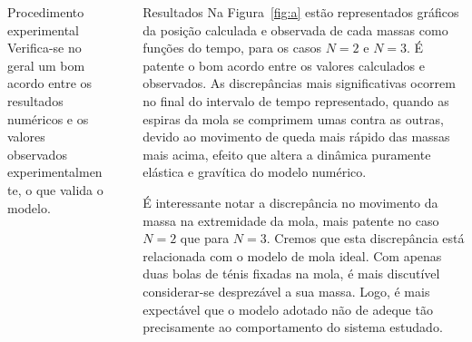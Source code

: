 \documentclass[final]{beamer}
\newlength{\sepwidth}
\newlength{\colwidth}
\newcommand{\separatorcolumn}{\begin{column}{\sepwidth}\end{column}}
\begin{document}
\begin{frame}[t]
\begin{columns}[t]
\begin{column}{\colwidth}
\begin{block}{Procedimento experimental}
Verifica-se no geral um bom acordo entre os resultados numéricos e os valores
observados experimentalmente, o que valida o modelo.
\end{block}
\end{column}
\separatorcolumn
\begin{column}{\colwidth}
\begin{block}{Resultados}
Na Figura~\ref{fig:a}  estão representados gráficos da posição calculada e
observada de cada massas como funções do tempo, para os casos $N=2$ e $N=3$. É
patente o bom acordo entre os valores calculados e observados. As discrepâncias
mais significativas ocorrem no final do intervalo de tempo representado, quando
as espiras da mola se comprimem umas contra as outras, devido ao movimento de
queda mais rápido das massas mais acima, efeito que altera a dinâmica puramente
elástica e gravítica do modelo numérico.

É interessante notar a discrepância no movimento da massa na extremidade
da mola, mais patente no caso $N=2$ que para $N=3$. Cremos que esta discrepância
está relacionada com o modelo de mola ideal. Com apenas duas bolas de ténis
fixadas na mola, é mais discutível considerar-se desprezável a sua massa. Logo,
é mais expectável que o modelo adotado não de adeque tão precisamente ao
comportamento do sistema estudado.
	

\end{block}
\end{column}
\end{columns}
\end{frame}
\end{document}
